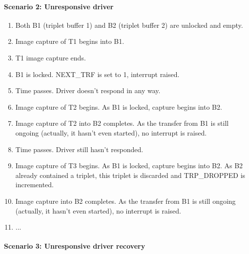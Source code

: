 \documentclass[12pt]{article}
\begin{document}
\paragraph{Scenario 2: Unresponsive driver}

\begin{enumerate}
\item Both B1 (triplet buffer 1) and B2 (triplet buffer 2) are unlocked and empty.
\item Image capture of T1 begins into B1.
\item T1 image capture ends.
\item B1 is locked. NEXT\_TRF is set to 1, interrupt raised.
\item Time passes. Driver doesn't respond in any way.
\item Image capture of T2 begins. As B1 is locked, capture begins into B2.
\item Image capture of T2 into B2 completes. As the transfer from B1 is still ongoing (actually, it hasn't even started), no interrupt is raised.
\item Time passes. Driver still hasn't responded.
\item Image capture of T3 begins. As B1 is locked, capture begins into B2. As B2 already contained a triplet, this triplet is discarded and TRP\_DROPPED is incremented.
\item Image capture into B2 completes. As the transfer from B1 is still ongoing (actually, it hasn't even started), no interrupt is raised.
\item ...
\end{enumerate}

\paragraph{Scenario 3: Unresponsive driver recovery}
\end{document}
